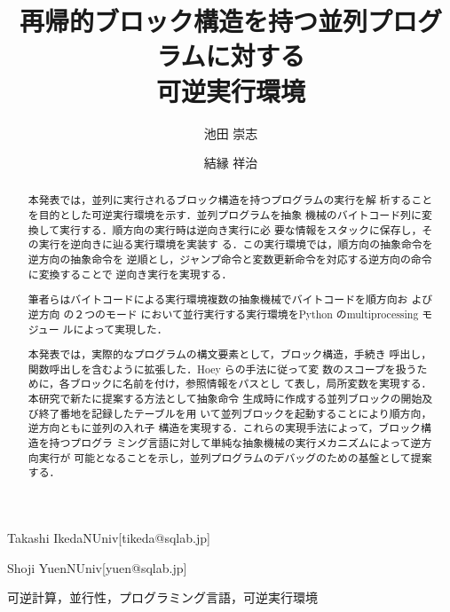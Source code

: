 \documentclass[submit,PRO]{ipsj}
\begin{document}
\title{再帰的ブロック構造を持つ並列プログラムに対する\\
      可逆実行環境}





\author{池田 崇志}{Takashi Ikeda}{NUniv}[tikeda@sqlab.jp]
\author{結縁 祥治}{Shoji Yuen}{NUniv}[yuen@sqlab.jp]


\begin{abstract}
本発表では，並列に実行されるブロック構造を持つプログラムの実行を解
析することを目的とした可逆実行環境を示す．並列プログラムを抽象
機械のバイトコード列に変換して実行する．順方向の実行時は逆向き実行に必
要な情報をスタックに保存し，その実行を逆向きに辿る実行環境を実装す
る．この実行環境では，順方向の抽象命令を逆方向の抽象命令を
逆順とし，ジャンプ命令と変数更新命令を対応する逆方向の命令に変換することで
逆向き実行を実現する．

筆者らはバイトコードによる実行環境複数の抽象機械でバイトコードを順方向お
よび逆方向%
の２つのモード%
において並行実行する実行環境をPython のmultiprocessing モジュー
ルによって実現した．

本発表では，実際的なプログラムの構文要素として，ブロック構造，手続き
呼出し，関数呼出しを含むように拡張した．Hoey らの手法に従って変
数のスコープを扱うために，各ブロックに名前を付け，参照情報をパスとし
て表し，局所変数を実現する．本研究で新たに提案する方法として抽象命令
生成時に作成する並列ブロックの開始及び終了番地を記録したテーブルを用
いて並列ブロックを起動することにより順方向，逆方向ともに並列の入れ子
構造を実現する．これらの実現手法によって，ブロック構造を持つプログラ
ミング言語に対して単純な抽象機械の実行メカニズムによって逆方向実行が
可能となることを示し，並列プログラムのデバッグのための基盤として提案
する．
\end{abstract}


\begin{jkeyword}
可逆計算，並行性，プログラミング言語，可逆実行環境
\end{jkeyword}
\end{document}

